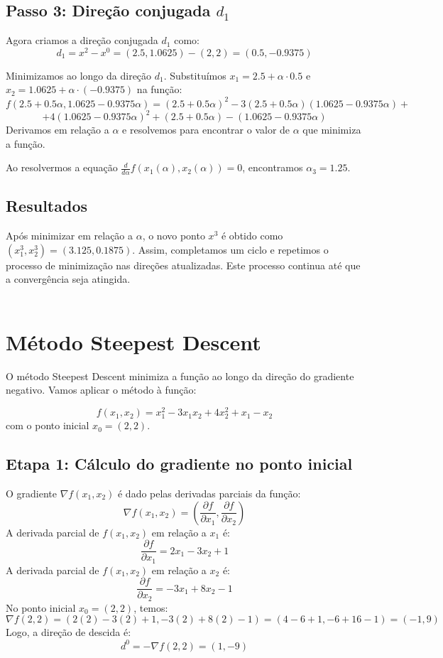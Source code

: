 \documentclass[a4paper, 12pt]{article}
\begin{document}
\subsection{Passo 3: Direção conjugada \( d_1 \)}
Agora criamos a direção conjugada \( d_1 \) como:
\[
d_1 = x^2 - x^0 = (2.5, 1.0625) - (2, 2) = (0.5, -0.9375)
\]

Minimizamos ao longo da direção \( d_1 \). Substituímos \( x_1 = 2.5 + \alpha \cdot 0.5 \) e \( x_2 = 1.0625 + \alpha \cdot (-0.9375) \) na função:
\[
f(2.5 + 0.5\alpha, 1.0625 - 0.9375\alpha) = (2.5 + 0.5\alpha)^2 - 3(2.5 + 0.5\alpha)(1.0625 - 0.9375\alpha) + 
\]
\[
+ 4(1.0625 - 0.9375\alpha)^2 + (2.5 + 0.5\alpha) - (1.0625 - 0.9375\alpha)
\]
Derivamos em relação a \( \alpha \) e resolvemos para encontrar o valor de \( \alpha \) que minimiza a função.

Ao resolvermos a equação \( \frac{d}{d\alpha} f(x_1(\alpha), x_2(\alpha)) = 0 \), encontramos \( \alpha_3 = 1.25 \).

\subsection{Resultados}
Após minimizar em relação a \( \alpha \), o novo ponto \( x^3 \) é obtido como \( (x_1^3, x_2^3) = (3.125, 0.1875) \). Assim, completamos um ciclo e repetimos o processo de minimização nas direções atualizadas. Este processo continua até que a convergência seja atingida.\\\\


\section{Método Steepest Descent}
O método Steepest Descent minimiza a função ao longo da direção do gradiente negativo. Vamos aplicar o método à função:

\[
f(x_1, x_2) = x_1^2 - 3x_1x_2 + 4x_2^2 + x_1 - x_2
\]
com o ponto inicial \( x_0 = (2, 2) \).

\subsection{Etapa 1: Cálculo do gradiente no ponto inicial}
O gradiente \( \nabla f(x_1, x_2) \) é dado pelas derivadas parciais da função:
\[
\nabla f(x_1, x_2) = \left( \frac{\partial f}{\partial x_1}, \frac{\partial f}{\partial x_2} \right)
\]
A derivada parcial de \( f(x_1, x_2) \) em relação a \( x_1 \) é:
\[
\frac{\partial f}{\partial x_1} = 2x_1 - 3x_2 + 1
\]
A derivada parcial de \( f(x_1, x_2) \) em relação a \( x_2 \) é:
\[
\frac{\partial f}{\partial x_2} = -3x_1 + 8x_2 - 1
\]
No ponto inicial \( x_0 = (2, 2) \), temos:
\[
\nabla f(2, 2) = (2(2) - 3(2) + 1, -3(2) + 8(2) - 1) = (4 - 6 + 1, -6 + 16 - 1) = (-1, 9)
\]
Logo, a direção de descida é:
\[
d^0 = -\nabla f(2, 2) = (1, -9)
\]
\end{document}
